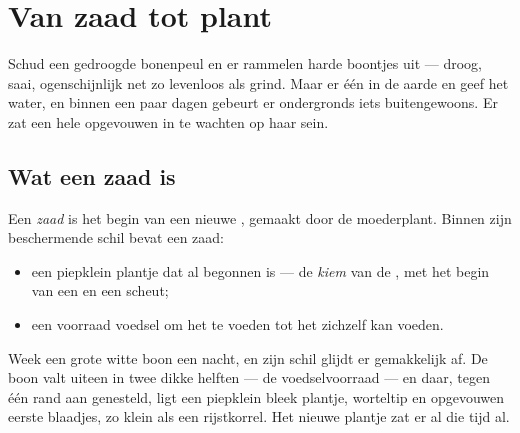 \chapter{Van zaad tot plant}\label{ch:g2:from-seed-to-plant}

Schud een gedroogde bonenpeul en er rammelen harde boontjes uit ---
droog, saai, ogenschijnlijk net zo levenloos als grind. Maar  er
één in de aarde en geef het water, en binnen een paar dagen gebeurt er
ondergronds iets buitengewoons. Er zat een hele  opgevouwen in te
wachten op haar sein.

\section{Wat een zaad is}

\begin{definition}[Zaad]\label{def:g2:from-seed-to-plant:seed}
Een \emph{zaad} is het begin van een nieuwe , gemaakt
door de moederplant. Binnen zijn beschermende schil bevat een zaad:
\begin{itemize}
  \item een piepklein plantje dat al begonnen is --- de
        \emph{kiem} van de , met het begin van een
         en een scheut;
  \item een voorraad voedsel om het te voeden tot het zichzelf kan voeden.
\end{itemize}
\end{definition}

\begin{example}\label{ex:g2:from-seed-to-plant:open}
Week een grote witte boon een nacht, en zijn schil glijdt er
gemakkelijk af. De boon valt uiteen in twee dikke helften --- de
voedselvoorraad --- en daar, tegen één rand aan genesteld, ligt een
piepklein bleek plantje, worteltip en opgevouwen eerste blaadjes, zo
klein als een rijstkorrel. Het nieuwe plantje zat er al die tijd al.
\end{example}

